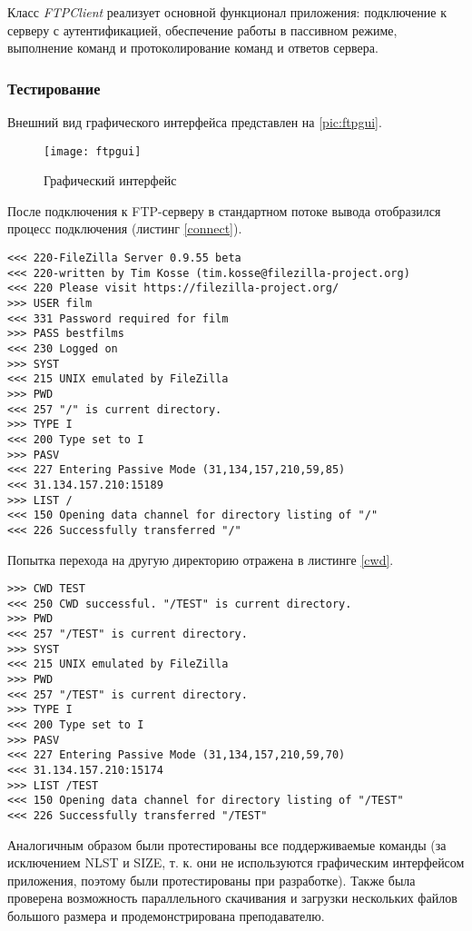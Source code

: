 Класс \textit{FTPClient} реализует основной функционал приложения: подключение к серверу с аутентификацией, обеспечение работы в пассивном режиме, выполнение команд и протоколирование команд и ответов сервера.

\subsubsection{Тестирование}

Внешний вид графического интерфейса представлен на \vref{pic:ftpgui}.

\begin{figure}[H]
	\centering
	\texttt{[image: ftpgui]}
	\caption{Графический интерфейс}
	\label{pic:ftpgui}
\end{figure}

После подключения к FTP-серверу в стандартном потоке вывода отобразился процесс подключения (листинг \vref{connect}).

\begin{lstlisting}[label=connect,caption=Результат подключения к серверу]
<<< 220-FileZilla Server 0.9.55 beta
<<< 220-written by Tim Kosse (tim.kosse@filezilla-project.org)
<<< 220 Please visit https://filezilla-project.org/
>>> USER film
<<< 331 Password required for film
>>> PASS bestfilms
<<< 230 Logged on
>>> SYST
<<< 215 UNIX emulated by FileZilla
>>> PWD
<<< 257 "/" is current directory.
>>> TYPE I
<<< 200 Type set to I
>>> PASV
<<< 227 Entering Passive Mode (31,134,157,210,59,85)
<<< 31.134.157.210:15189
>>> LIST /
<<< 150 Opening data channel for directory listing of "/"
<<< 226 Successfully transferred "/"
\end{lstlisting}

Попытка перехода на другую директорию отражена в листинге \vref{cwd}.

\begin{lstlisting}[label=cwd,caption=Переход в папку тест]
>>> CWD TEST
<<< 250 CWD successful. "/TEST" is current directory.
>>> PWD
<<< 257 "/TEST" is current directory.
>>> SYST
<<< 215 UNIX emulated by FileZilla
>>> PWD
<<< 257 "/TEST" is current directory.
>>> TYPE I
<<< 200 Type set to I
>>> PASV
<<< 227 Entering Passive Mode (31,134,157,210,59,70)
<<< 31.134.157.210:15174
>>> LIST /TEST
<<< 150 Opening data channel for directory listing of "/TEST"
<<< 226 Successfully transferred "/TEST"
\end{lstlisting}

Аналогичным образом были протестированы все поддерживаемые команды (за исключением NLST и SIZE, т. к. они не используются графическим интерфейсом приложения, поэтому были протестированы при разработке). Также была проверена возможность параллельного скачивания и загрузки нескольких файлов большого размера и продемонстрирована преподавателю.


